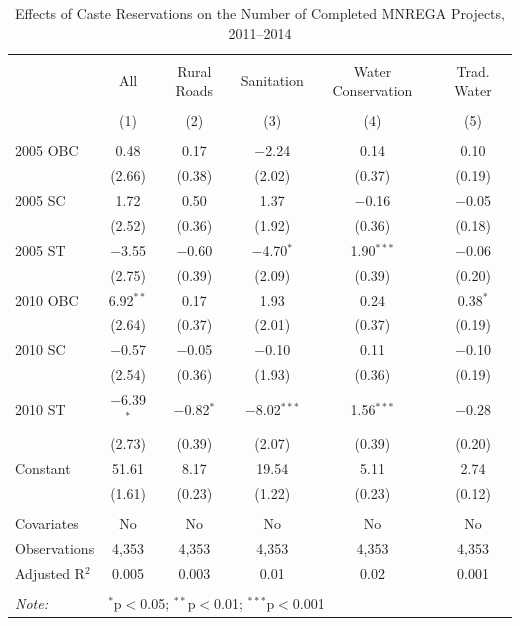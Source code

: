 \begin{table}[!htbp]
\centering
\begin{threeparttable}

  \caption{Effects of Caste Reservations on the Number of Completed MNREGA Projects, 2011--2014} 
  \label{main_caste_mnrega} 
\scriptsize 
\begin{tabular}{@{\extracolsep{0pt}}lccccc} 
\\[-1.8ex]\hline 
\hline \\[-1.8ex] 
 & All & Rural Roads & Sanitation & Water Conservation & Trad. Water \\ 
\\[-1.8ex] & (1) & (2) & (3) & (4) & (5)\\ 
\hline \\[-1.8ex] 
 2005 OBC & 0.48 & 0.17 & $-$2.24 & 0.14 & 0.10 \\ 
  & (2.66) & (0.38) & (2.02) & (0.37) & (0.19) \\ 
  2005 SC & 1.72 & 0.50 & 1.37 & $-$0.16 & $-$0.05 \\ 
  & (2.52) & (0.36) & (1.92) & (0.36) & (0.18) \\ 
  2005 ST & $-$3.55 & $-$0.60 & $-$4.70$^{*}$ & 1.90$^{***}$ & $-$0.06 \\ 
  & (2.75) & (0.39) & (2.09) & (0.39) & (0.20) \\ 
  2010 OBC & 6.92$^{**}$ & 0.17 & 1.93 & 0.24 & 0.38$^{*}$ \\ 
  & (2.64) & (0.37) & (2.01) & (0.37) & (0.19) \\ 
  2010 SC & $-$0.57 & $-$0.05 & $-$0.10 & 0.11 & $-$0.10 \\ 
  & (2.54) & (0.36) & (1.93) & (0.36) & (0.19) \\ 
  2010 ST & $-$6.39$^{*}$ & $-$0.82$^{*}$ & $-$8.02$^{***}$ & 1.56$^{***}$ & $-$0.28 \\ 
  & (2.73) & (0.39) & (2.07) & (0.39) & (0.20) \\ 
  Constant & 51.61 & 8.17 & 19.54 & 5.11 & 2.74 \\ 
  & (1.61) & (0.23) & (1.22) & (0.23) & (0.12) \\ 
 \hline \\[-1.8ex] 
Covariates & No & No & No & No & No \\ 
Observations & 4,353 & 4,353 & 4,353 & 4,353 & 4,353 \\ 
Adjusted R$^{2}$ & 0.005 & 0.003 & 0.01 & 0.02 & 0.001 \\ 
\hline 
\hline \\[-1.8ex] 
\textit{Note:}  & \multicolumn{5}{l}{$^{*}$p$<$0.05; $^{**}$p$<$0.01; $^{***}$p$<$0.001} \\ 

\end{tabular}
\end{threeparttable}
\end{table}
